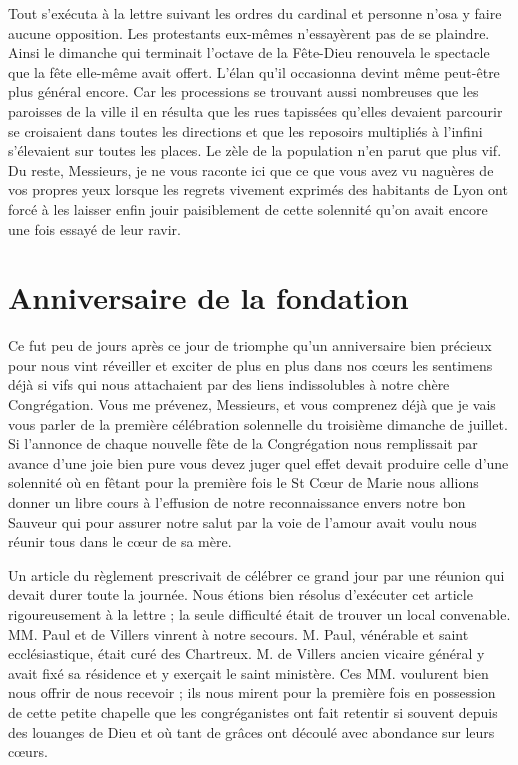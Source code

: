 Tout s'exécuta à la lettre suivant les ordres du cardinal et personne n'osa y faire aucune opposition. Les protestants eux-mêmes n'essayèrent pas de se plaindre. Ainsi le dimanche qui terminait l'octave de la Fête-Dieu renouvela le spectacle
que la fête elle-même avait offert. L'élan qu'il occasionna devint même peut-être plus général encore. Car les processions se trouvant aussi nombreuses que les paroisses de la ville il en résulta que les rues tapissées qu'elles devaient parcourir se croisaient dans toutes les directions et que les reposoirs multipliés à l'infini s'élevaient sur toutes les places. Le zèle de la population n'en parut que plus vif. Du reste, Messieurs, je ne vous raconte ici que ce que vous avez vu naguères de vos propres yeux lorsque les regrets vivement exprimés des habitants de Lyon ont forcé à les laisser enfin jouir paisiblement de cette solennité qu'on avait encore une fois essayé de leur ravir.

\section*{Anniversaire de la fondation}
Ce fut peu de jours après ce jour de triomphe qu'un anniversaire bien précieux pour nous vint réveiller et exciter de plus en plus dans nos cœurs les sentimens déjà si vifs qui nous attachaient par des liens indissolubles à notre chère Congrégation. Vous me prévenez, Messieurs, et vous comprenez déjà que je vais vous parler de la première célébration solennelle du troisième dimanche de juillet. Si l'annonce de chaque nouvelle fête de la Congrégation nous remplissait par avance d'une joie bien pure vous devez juger quel effet devait produire celle d'une solennité où en fêtant pour la première fois le St Cœur de Marie nous allions donner un libre cours à l'effusion de notre reconnaissance envers notre bon Sauveur qui pour assurer notre salut par la voie de l'amour avait voulu nous réunir tous dans le cœur de sa mère.

Un article du règlement prescrivait de célébrer ce
grand jour par une réunion qui devait durer toute la journée. Nous étions bien résolus d'exécuter cet article rigoureusement à la lettre ; la seule difficulté était de trouver un local convenable. MM. Paul et de Villers vinrent à notre secours. M. Paul, vénérable et saint ecclésiastique, était curé des Chartreux. M. de Villers ancien vicaire général y avait fixé sa résidence et y exerçait le saint ministère. Ces MM. voulurent bien nous offrir de nous recevoir ; ils nous mirent pour la première fois en possession de cette petite chapelle que les congréganistes ont fait retentir si souvent depuis des louanges de Dieu et où tant de grâces ont découlé avec abondance sur leurs cœurs.

